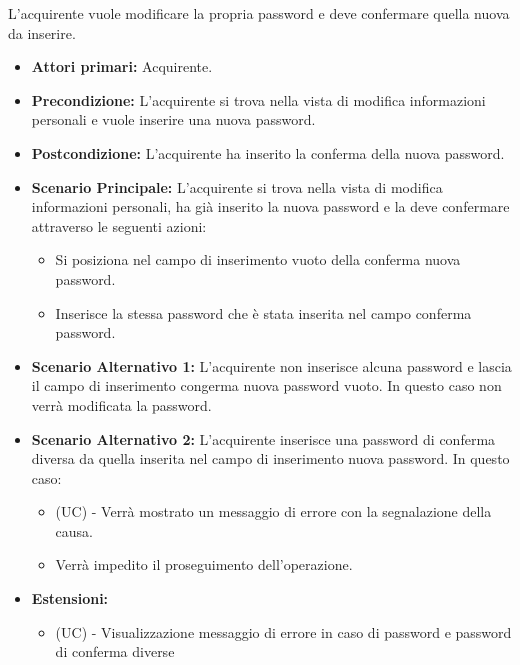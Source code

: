 L'acquirente vuole modificare la propria password e deve confermare quella nuova da inserire.
\begin{itemize}
    \item \textbf{Attori primari:} Acquirente.
    \item \textbf{Precondizione:} L'acquirente si trova nella vista di modifica informazioni personali e vuole inserire una nuova password.
    \item \textbf{Postcondizione:} L'acquirente ha inserito la conferma della nuova password.
    \item \textbf{Scenario Principale:} L'acquirente si trova nella vista di modifica informazioni personali, ha già inserito la nuova password e la deve confermare attraverso le seguenti azioni:
        \begin{itemize}
            \item Si posiziona nel campo di inserimento vuoto della conferma nuova password.
            \item Inserisce la stessa password che è stata inserita nel campo conferma password.
        \end{itemize}
    \item \textbf{Scenario Alternativo 1:} L'acquirente non inserisce alcuna password e lascia il campo di inserimento congerma nuova password vuoto. In questo caso non verrà modificata la password.
    \item \textbf{Scenario Alternativo 2:} L'acquirente inserisce una password di conferma diversa da quella inserita nel campo di inserimento nuova password. In questo caso:
    \begin{itemize}
        \item (UC) - Verrà mostrato un messaggio di errore con la segnalazione della causa.
        \item Verrà impedito il proseguimento dell'operazione.
    \end{itemize}
    \item \textbf{Estensioni:}
    \begin{itemize}
        \item (UC) - Visualizzazione messaggio di errore in caso di password e password di conferma diverse
    \end{itemize}
\end{itemize}


